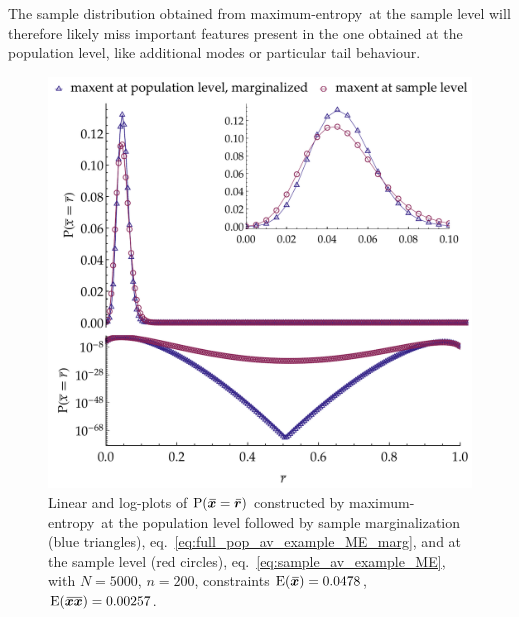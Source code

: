 \documentclass{article}
\theoremstyle{remark}
\theoremstyle{innote}
\renewcommand*{\|}{\mathpunct{|}}%
\newcommand*{\p}{\mathrm{P}}%
\newcommand*{\eqn}{eq.}%
\newcommand*{\E}{\mathrm{E}}
\DeclarePairedDelimiter\expp{(}{)}
\newcommand*{\expe}{\E\expp}%
\theoremstyle{simple}
\newcommand*{\widebar}[1]{{\mkern1.5mu\skew{2}\overline{\mkern-1.5mu#1\mkern-1.5mu}\mkern 1.5mu}}
\newcommand*{\sav}{\widebar} %
\newcommand*{\yxx}{x}%
\newcommand*{\yx}{\bm{\yxx}}%
\newcommand*{\yxs}{\sav{\yx}}%
\newcommand*{\yxxs}{\sav{\yx\yx}}%
\newcommand*{\yr}{\bm{r}}%
\newcommand*{\yrs}{\sav{\yr}}%
\newcommand*{\me}{maximum-entropy}
\begin{document}
The sample distribution obtained from \me\ at the sample level will
therefore likely miss important features present in the one obtained at the
population level, like additional modes or particular tail behaviour.


\begin{figure}[!t]
\centering
\includegraphics[width=0.99\linewidth]{different_maxent_pop_sample_200_realdata_2mom.pdf}%
\caption{Linear and log-plots of $\p(\yxs = \yrs)$ constructed by \me\ at the population
  level followed by sample marginalization (blue triangles),
  \eqn~\eqref{eq:full_pop_av_example_ME_marg}, and at the sample level (red
  circles), \eqn~\eqref{eq:sample_av_example_ME}, with $N=5000$,
  $n=200$, constraints $\expe{\yxs}=0.0478$, $\expe{\yxxs}=0.00257$.}
\label{fig:diff_maxent_pop_sample}
\end{figure}%
\end{document}
